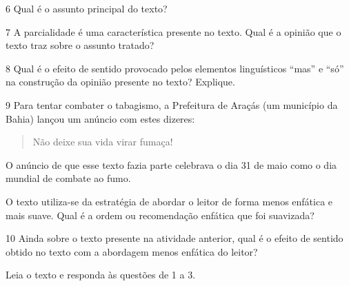 \num{6} Qual é o assunto principal do texto?


\num{7} A parcialidade é uma característica presente no texto. Qual é a
opinião que o texto traz sobre o assunto tratado?


\num{8} Qual é o efeito de sentido provocado pelos elementos
linguísticos ``mas'' e ``só'' na construção da opinião presente no
texto? Explique.


\num{9} Para tentar combater o tabagismo, a Prefeitura de Araçás (um
município da Bahia) lançou um anúncio com estes dizeres:

\begin{quote}
Não deixe sua vida virar fumaça!
\end{quote}

O anúncio de que esse texto fazia parte celebrava o dia 31 de maio como
o dia mundial de combate ao fumo.

O texto utiliza-se da estratégia de abordar o leitor de forma menos
enfática e mais suave. Qual é a ordem ou recomendação enfática que foi
suavizada?


\num{10} Ainda sobre o texto presente na atividade anterior, qual é o
efeito de sentido obtido no texto com a abordagem menos enfática do
leitor?



Leia o texto e responda às questões de 1 a 3.


